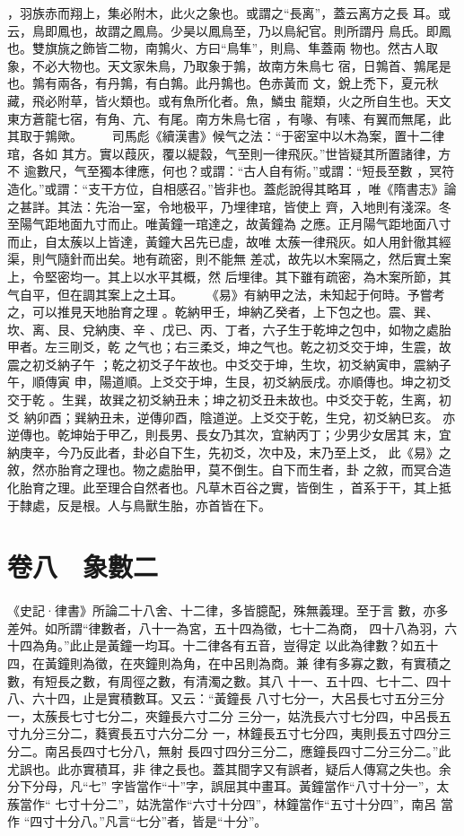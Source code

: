 \documentclass{ctexart}
\begin{document}
，羽族赤而翔上，集必附木，此火之象也。或謂之``長离''，蓋云离方之長 耳。或云，鳥即鳳也，故謂之鳳鳥。少昊以鳳鳥至，乃以鳥紀官。則所謂丹 鳥氏。即鳳也。雙旗旐之飾皆二物，南鶉火、方曰``鳥隼''，則鳥、隼蓋兩 物也。然古人取象，不必大物也。天文家朱鳥，乃取象于鶉，故南方朱鳥七 宿，日鶉首、鶉尾是也。鶉有兩各，有丹鶉，有白鶉。此丹鶉也。色赤黃而 文，銳上禿下，夏元秋藏，飛必附草，皆火類也。或有魚所化者。魚，鱗虫 龍類，火之所自生也。天文東方蒼龍七宿，有角、亢、有尾。南方朱鳥七宿 ，有喙、有嗉、有翼而無尾，此其取于鶉歟。 　　司馬彪《續漢書》候气之法：``于密室中以木為案，置十二律琯，各如 其方。實以葭灰，覆以緹縠，气至則一律飛灰。''世皆疑其所置諸律，方不 逾數尺，气至獨本律應，何也？或謂：``古人自有術。''或謂：``短長至數 ，冥符造化。''或謂：``支干方位，自相感召。''皆非也。蓋彪說得其略耳 ，唯《隋書志》論之甚詳。其法：先治一室，令地极平，乃埋律琯，皆使上 齊，入地則有淺深。冬至陽气距地面九寸而止。唯黃鐘一琯達之，故黃鐘為 之應。正月陽气距地面八寸而止，自太蔟以上皆達，黃鐘大呂先已虛，故唯 太蔟一律飛灰。如人用針徹其經渠，則气隨針而出矣。地有疏密，則不能無 差忒，故先以木案隔之，然后實土案上，令堅密均一。其上以水平其概，然 后埋律。其下雖有疏密，為木案所節，其气自平，但在調其案上之土耳。 　　《易》有納甲之法，未知起于何時。予嘗考之，可以推見天地胎育之理 。乾納甲壬，坤納乙癸者，上下包之也。震、巽、坎、离、艮、兌納庚、辛 、戊已、丙、丁者，六子生于乾坤之包中，如物之處胎甲者。左三剛爻，乾 之气也；右三柔爻，坤之气也。乾之初爻交于坤，生震，故震之初爻納子午 ；乾之初爻子午故也。中爻交于坤，生坎，初爻納寅申，震納子午，順傳寅 申，陽道順。上爻交于坤，生艮，初爻納辰戌。亦順傳也。坤之初爻交于乾 。生巽，故巽之初爻納丑未；坤之初爻丑未故也。中爻交于乾，生离，初爻 納卯酉；巽納丑未，逆傳卯酉，陰道逆。上爻交于乾，生兌，初爻納巳亥。 亦逆傳也。乾坤始于甲乙，則長男、長女乃其次，宜納丙丁；少男少女居其 末，宜納庚辛，今乃反此者，卦必自下生，先初爻，次中及，末乃至上爻， 此《易》之敘，然亦胎育之理也。物之處胎甲，莫不倒生。自下而生者，卦 之敘，而冥合造化胎育之理。此至理合自然者也。凡草木百谷之實，皆倒生 ，首系于干，其上抵于隸處，反是根。人与鳥獸生胎，亦首皆在下。
\clearpage
\section{卷八　象數二}
\paragraph{}
《史記·律書》所論二十八舍、十二律，多皆臆配，殊無義理。至于言 數，亦多差舛。如所謂``律數者，八十一為宮，五十四為徵，七十二為商， 四十八為羽，六十四為角。''此止是黃鐘一均耳。十二律各有五音，豈得定 以此為律數？如五十四，在黃鐘則為徵，在夾鐘則為角，在中呂則為商。兼 律有多寡之數，有實積之數，有短長之數，有周徑之數，有清濁之數。其八 十一、五十四、七十二、四十八、六十四，止是實積數耳。又云：``黃鐘長 八寸七分一，大呂長七寸五分三分一，太蔟長七寸七分二，夾鐘長六寸二分 三分一，姑洗長六寸七分四，中呂長五寸九分三分二，蕤賓長五寸六分二分 一，林鐘長五寸七分四，夷則長五寸四分三分二。南呂長四寸七分八，無射 長四寸四分三分二，應鐘長四寸二分三分二。''此尤誤也。此亦實積耳，非 律之長也。蓋其間字又有誤者，疑后人傳寫之失也。余分下分母，凡``七'' 字皆當作``十''字，誤屈其中畫耳。黃鐘當作``八寸十分一''，太蔟當作`` 七寸十分二''，姑洗當作``六寸十分四''，林鐘當作``五寸十分四''，南呂 當作 ``四寸十分八。''凡言``七分''者，皆是``十分''。
\end{document}
